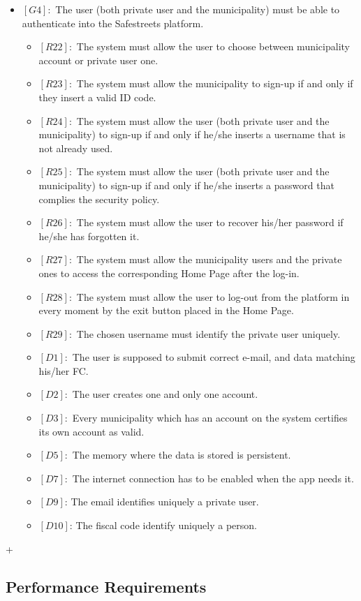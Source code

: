 \documentclass[titlepage]{article}
\begin{document}
\begin{itemize}
 
 \item $[G4]:$ The user (both private user and the municipality) must be able to authenticate into the Safestreets platform.
 \begin{itemize}
 \item $[R22]:$ The system must allow the user to choose between municipality account or private user one.
 \item $[R23]:$ The system must allow the municipality to sign-up if and only if they insert a valid ID code.
 \item $[R24]:$ The system must allow the user (both private user and the municipality) to sign-up if and only if he/she inserts a username that is not already used.
 \item $[R25]:$ The system must allow the user (both private user and the municipality) to sign-up if and only if he/she inserts a password that complies the security policy.
 \item $[R26]:$ The system must allow the user to recover his/her password if he/she has forgotten it.
 \item $[R27]:$ The system must allow the municipality users and the private ones to access the corresponding Home Page after the log-in.
 \item $[R28]:$ The system must allow the user to log-out from the platform in every moment by the exit button placed in the Home Page.
 \item $[R29]:$ The chosen username must identify the private user uniquely.
 \item $[D1]:$ The user is supposed to submit correct e-mail, and data matching his/her FC.
 \item $[D2]:$ The user creates one and only one account.
 \item $[D3]:$ Every municipality which has an account on the system certifies its own account as valid.
 \item $[D5]:$ The memory where the data is stored is persistent.
 \item $[D7]:$ The internet connection has to be enabled when the app needs it.
 \item $[D9]$: The email identifies uniquely a private user.
 \item $[D10]$: The fiscal code identify uniquely a person.
 \end{itemize}
 
 
\end{itemize}


+
\subsection{Performance Requirements}
\end{document}
